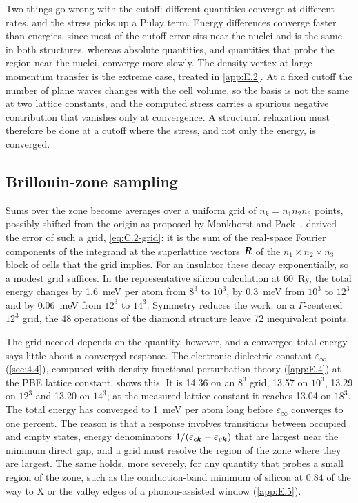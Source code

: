Two things go wrong with the cutoff: different quantities converge at different rates, and the stress picks up a Pulay term. Energy differences converge faster than energies, since most of the cutoff error sits near the nuclei and is the same in both structures, whereas absolute quantities, and quantities that probe the region near the nuclei, converge more slowly. The density vertex at large momentum transfer is the extreme case, treated in \cref{app:E.2}. At a fixed cutoff the number of plane waves changes with the cell volume, so the basis is not the same at two lattice constants, and the computed stress carries a spurious negative contribution that vanishes only at convergence. A structural relaxation must therefore be done at a cutoff where the stress, and not only the energy, is converged.

\subsection{Brillouin-zone sampling}

Sums over the zone become averages over a uniform grid of $n_k = n_1n_2n_3$ points, possibly shifted from the origin as proposed by Monkhorst and Pack~\cite{monkhorst1976special}.  derived the error of such a grid, \cref{eq:C.2-grid}: it is the sum of the real-space Fourier components of the integrand at the superlattice vectors $\bm{R}$ of the $n_1\times n_2\times n_3$ block of cells that the grid implies. For an insulator these decay exponentially, so a modest grid suffices. In the representative silicon calculation at \SI{60}{Ry}, the total energy changes by \SI{1.6}{meV} per atom from $8^3$ to $10^3$, by \SI{0.3}{meV} from $10^3$ to $12^3$ and by \SI{0.06}{meV} from $12^3$ to $14^3$. Symmetry reduces the work: on a $\Gamma$-centered $12^3$ grid, the 48 operations of the diamond structure leave 72 inequivalent points.

The grid needed depends on the quantity, however, and a converged total energy says little about a converged response. The electronic dielectric constant $\varepsilon_\infty$ (\cref{sec:4.4}), computed with density-functional perturbation theory (\cref{app:E.4}) at the PBE lattice constant, shows this. It is 14.36 on an $8^3$ grid, 13.57 on $10^3$, 13.29 on $12^3$ and 13.20 on $14^3$; at the measured lattice constant it reaches 13.04 on $18^3$. The total energy has converged to \SI{1}{meV} per atom long before $\varepsilon_\infty$ converges to one percent. The reason is that a response involves transitions between occupied and empty states, energy denominators $1/(\varepsilon_{c\bm{k}} - \varepsilon_{v\bm{k}})$ that are largest near the minimum direct gap, and a grid must resolve the region of the zone where they are largest. The same holds, more severely, for any quantity that probes a small region of the zone, such as the conduction-band minimum of silicon at $0.84$ of the way to X or the valley edges of a phonon-assisted window (\cref{app:E.5}).

